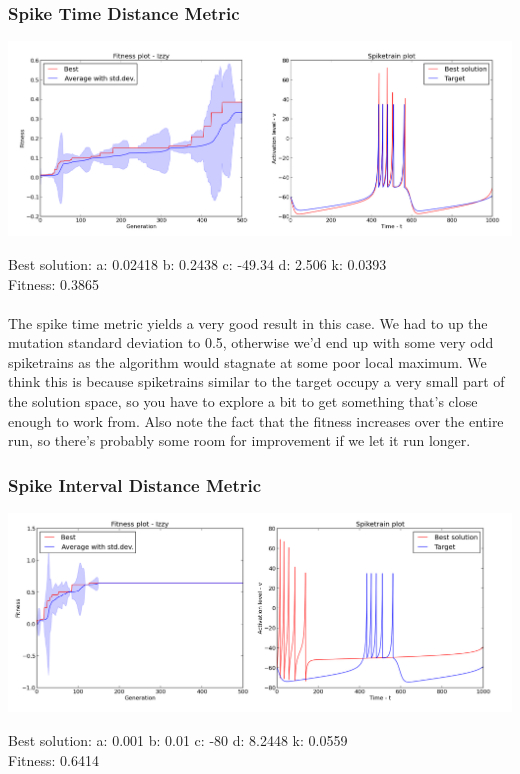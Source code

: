 \documentclass[a4paper,12pt]{article}
\begin{document}
\subsubsection{Spike Time Distance Metric}
\centerline{\includegraphics[width=1.0\textwidth]{img/case1_time}}
Best solution: 
a: 0.02418 
b: 0.2438 
c: -49.34 
d: 2.506 
k: 0.0393 \\
Fitness: 0.3865
\paragraph{}The spike time metric yields a very good result in this case. We had to up the mutation standard deviation to 0.5, otherwise we'd end up with some very odd spiketrains as the algorithm would stagnate at some poor local maximum. We think this is because spiketrains similar to the target occupy a very small part of the solution space, so you have to explore a bit to get something that's close enough to work from. Also note the fact that the fitness increases over the entire run, so there's probably some room for improvement if we let it run longer.

\subsubsection{Spike Interval Distance Metric}
\centerline{\includegraphics[width=1.0\textwidth]{img/case1_int}}
Best solution: 
a: 0.001 
b: 0.01 
c: -80 
d: 8.2448 
k: 0.0559 \\
Fitness: 0.6414
\end{document}
